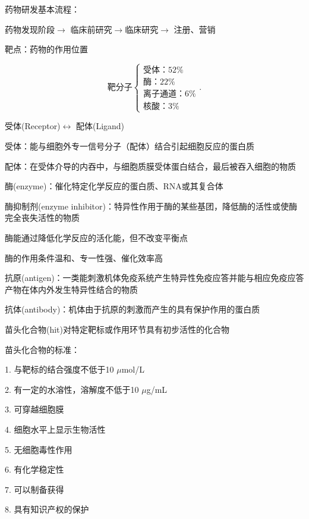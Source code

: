 药物研发基本流程：

药物发现阶段$\to $ 临床前研究$ \to $临床研究$\to $ 注册、营销

\begin{defi}
    靶点：药物的作用位置
\end{defi}
\[
    \text{靶分子}\begin{cases}
        \text{受体：52\%}\\
        \text{酶：22\%}\\
        \text{离子通道：6\%}\\
        \text{核酸：3\%}
    \end{cases}
.\] 
\begin{defi}
    受体(Receptor)$\leftrightarrow$ 配体(Ligand)

    受体：能与细胞外专一信号分子（配体）结合引起细胞反应的蛋白质

    配体：在受体介导的内吞中，与细胞质膜受体蛋白结合，最后被吞入细胞的物质
\end{defi}
\begin{defi}
    酶(enzyme)：催化特定化学反应的蛋白质、RNA或其复合体

    酶抑制剂(enzyme inhibitor)：特异性作用于酶的某些基团，降低酶的活性或使酶完全丧失活性的物质
\end{defi}
\begin{notation}
    酶能通过降低化学反应的活化能，但不改变平衡点

    酶的作用条件温和、专一性强、催化效率高
\end{notation}
\begin{defi}
    抗原(antigen)：一类能刺激机体免疫系统产生特异性免疫应答并能与相应免疫应答产物在体内外发生特异性结合的物质

    抗体(antibody)：机体由于抗原的刺激而产生的具有保护作用的蛋白质
\end{defi}
\begin{defi}
    苗头化合物(hit)对特定靶标或作用环节具有初步活性的化合物
\end{defi}
\begin{notation}
    苗头化合物的标准：

    1. 与靶标的结合强度不低于10 $\mu$mol/L

    2. 有一定的水溶性，溶解度不低于10 $\mu$g/mL

    3. 可穿越细胞膜

    4. 细胞水平上显示生物活性

    5. 无细胞毒性作用

    6. 有化学稳定性

    7. 可以制备获得

    8. 具有知识产权的保护
\end{notation}
